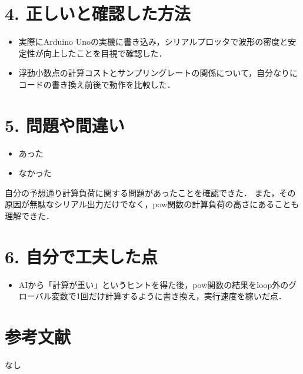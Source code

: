 \documentclass[uplatex,dvipdfmx]{jsarticle}
\begin{document}
\section*{4. 正しいと確認した方法} 
\begin{itemize}
    \item 実際にArduino Unoの実機に書き込み，シリアルプロッタで波形の密度と安定性が向上したことを目視で確認した．
    \item 浮動小数点の計算コストとサンプリングレートの関係について，自分なりにコードの書き換え前後で動作を比較した．
\end{itemize}

\section*{5. 問題や間違い} 
\begin{itemize}
    \item [\rlap{$\square$}\raisebox{.15ex}{\hspace{0.1em}$\checkmark$}] あった %
    \item [$\square$] なかった %
\end{itemize}
自分の予想通り計算負荷に関する問題があったことを確認できた．
また，その原因が無駄なシリアル出力だけでなく，pow関数の計算負荷の高さにあることも理解できた．

\section*{6. 自分で工夫した点} 
\begin{itemize}
    \item AIから「計算が重い」というヒントを得た後，pow関数の結果をloop外のグローバル変数で1回だけ計算するように書き換え，実行速度を稼いだ点．
\end{itemize}

\section*{参考文献} %
なし
\end{document}
